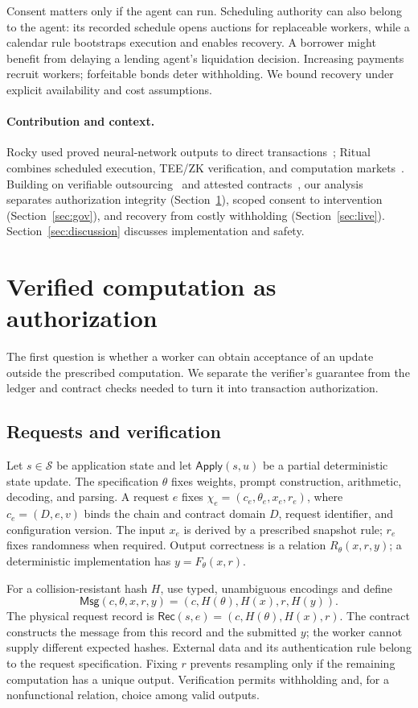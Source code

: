 \documentclass[runningheads,orivec]{llncs}
\newcommand{\Msg}{\mathsf{Msg}}
\newcommand{\Rec}{\mathsf{Rec}}
\newcommand{\Apply}{\mathsf{Apply}}
\begin{document}
Consent matters only if the agent can run. Scheduling authority can also belong to the agent: its recorded schedule opens auctions for replaceable workers, while a calendar rule bootstraps execution and enables recovery. A borrower might benefit from delaying a lending agent's liquidation decision. Increasing payments recruit workers; forfeitable bonds deter withholding. We bound recovery under explicit availability and cost assumptions.

\paragraph{Contribution and context.}
Rocky used proved neural-network outputs to direct transactions~\cite{rocky2022}; Ritual combines scheduled execution, TEE/ZK verification, and computation markets~\cite{ritual2025}. Building on verifiable outsourcing~\cite{gennaro2010,pinocchio2013} and attested contracts~\cite{ekiden2019}, our analysis separates authorization integrity (Section~\ref{sec:auth}), scoped consent to intervention (Section~\ref{sec:gov}), and recovery from costly withholding (Section~\ref{sec:live}). Section~\ref{sec:discussion} discusses implementation and safety.

\section{Verified computation as authorization}\label{sec:auth}
The first question is whether a worker can obtain acceptance of an update outside the prescribed computation. We separate the verifier's guarantee from the ledger and contract checks needed to turn it into transaction authorization.

\subsection{Requests and verification}
Let $s\in\mathcal S$ be application state and let $\Apply(s,u)$ be a partial deterministic state update. The specification $\theta$ fixes weights, prompt construction, arithmetic, decoding, and parsing. A request $e$ fixes $\chi_e=(c_e,\theta_e,x_e,r_e)$, where $c_e=(D,e,v)$ binds the chain and contract domain $D$, request identifier, and configuration version. The input $x_e$ is derived by a prescribed snapshot rule; $r_e$ fixes randomness when required. Output correctness is a relation $R_\theta(x,r,y)$; a deterministic implementation has $y=F_\theta(x,r)$.

For a collision-resistant hash $H$, use typed, unambiguous encodings and define
\[
 \Msg(c,\theta,x,r,y)=(c,H(\theta),H(x),r,H(y)).
\]
The physical request record is $\Rec(s,e)=(c,H(\theta),H(x),r)$. The contract constructs the message from this record and the submitted $y$; the worker cannot supply different expected hashes. External data and its authentication rule belong to the request specification. Fixing $r$ prevents resampling only if the remaining computation has a unique output. Verification permits withholding and, for a nonfunctional relation, choice among valid outputs.
\end{document}
